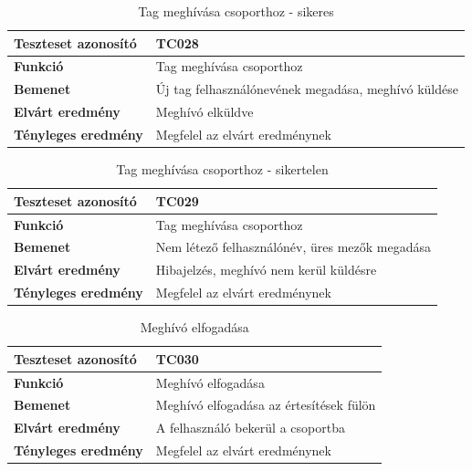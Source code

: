 \begin{table}[h!]
	\centering
	\begin{tabular}{|l|p{10cm}|}
		\hline
		\textbf{Teszteset azonosító} & TC028 \\ \hline
		\textbf{Funkció} & Tag meghívása csoporthoz \\ \hline
		\textbf{Bemenet} & Új tag felhasználónevének megadása, meghívó küldése \\ \hline
		\textbf{Elvárt eredmény} & Meghívó elküldve\\ \hline
		\textbf{Tényleges eredmény} & Megfelel az elvárt eredménynek \\ \hline
	\end{tabular}
	\caption{Tag meghívása csoporthoz - sikeres}
	\label{tab:tag_hozzaadasa}
\end{table}

\begin{table}[h!]
	\centering
	\begin{tabular}{|l|p{10cm}|}
		\hline
		\textbf{Teszteset azonosító} & TC029 \\ \hline
		\textbf{Funkció} & Tag meghívása csoporthoz \\ \hline
		\textbf{Bemenet} & Nem létező felhasználónév, üres mezők megadása \\ \hline
		\textbf{Elvárt eredmény} & Hibajelzés, meghívó nem kerül küldésre\\ \hline
		\textbf{Tényleges eredmény} & Megfelel az elvárt eredménynek \\ \hline
	\end{tabular}
	\caption{Tag meghívása csoporthoz - sikertelen}
	\label{tab:tag_hozzaadasa_sikertelen}
\end{table}

\begin{table}[h!]
	\centering
	\begin{tabular}{|l|p{10cm}|}
		\hline
		\textbf{Teszteset azonosító} & TC030 \\ \hline
		\textbf{Funkció} & Meghívó elfogadása \\ \hline
		\textbf{Bemenet} & Meghívó elfogadása az értesítések fülön \\ \hline
		\textbf{Elvárt eredmény} & A felhasználó bekerül a csoportba \\ \hline
		\textbf{Tényleges eredmény} & Megfelel az elvárt eredménynek \\ \hline
	\end{tabular}
	\caption{Meghívó elfogadása}
	\label{tab:meghivo_elfogadasa}
\end{table}


